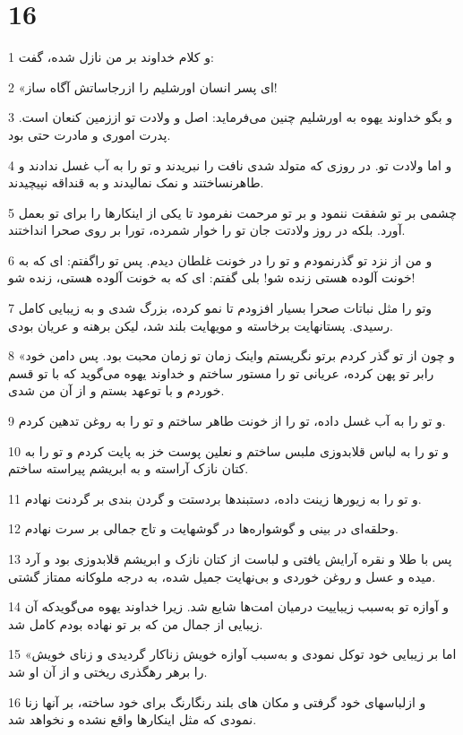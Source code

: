 \chapter{16}

\par 1 و کلام خداوند بر من نازل شده، گفت:
\par 2 «ای پسر انسان اورشلیم را ازرجاساتش آگاه ساز!
\par 3 و بگو خداوند یهوه به اورشلیم چنین می‌فرماید: اصل و ولادت تو اززمین کنعان است. پدرت اموری و مادرت حتی بود.
\par 4 و اما ولادت تو. در روزی که متولد شدی نافت را نبریدند و تو را به آب غسل ندادند و طاهرنساختند و نمک نمالیدند و به قنداقه نپیچیدند.
\par 5 چشمی بر تو شفقت ننمود و بر تو مرحمت نفرمود تا یکی از اینکارها را برای تو بعمل آورد. بلکه در روز ولادتت جان تو را خوار شمرده، تورا بر روی صحرا انداختند.
\par 6 و من از نزد تو گذرنمودم و تو را در خونت غلطان دیدم. پس تو راگفتم: ای که به خونت آلوده هستی زنده شو! بلی گفتم: ای که به خونت آلوده هستی، زنده شو!
\par 7 وتو را مثل نباتات صحرا بسیار افزودم تا نمو کرده، بزرگ شدی و به زیبایی کامل رسیدی. پستانهایت برخاسته و مویهایت بلند شد، لیکن برهنه و عریان بودی.
\par 8 «و چون از تو گذر کردم برتو نگریستم واینک زمان تو زمان محبت بود. پس دامن خود رابر تو پهن کرده، عریانی تو را مستور ساختم و خداوند یهوه می‌گوید که با تو قسم خوردم و با توعهد بستم و از آن من شدی.
\par 9 و تو را به آب غسل داده، تو را از خونت طاهر ساختم و تو را به روغن تدهین کردم.
\par 10 و تو را به لباس قلابدوزی ملبس ساختم و نعلین پوست خز به پایت کردم و تو را به کتان نازک آراسته و به ابریشم پیراسته ساختم.
\par 11 و تو را به زیورها زینت داده، دستبندها بردستت و گردن بندی بر گردنت نهادم.
\par 12 وحلقه‌ای در بینی و گوشواره‌ها در گوشهایت و تاج جمالی بر سرت نهادم.
\par 13 پس با طلا و نقره آرایش یافتی و لباست از کتان نازک و ابریشم قلابدوزی بود و آرد میده و عسل و روغن خوردی و بی‌نهایت جمیل شده، به درجه ملوکانه ممتاز گشتی.
\par 14 و آوازه تو به‌سبب زیباییت درمیان امت‌ها شایع شد. زیرا خداوند یهوه می‌گویدکه آن زیبایی از جمال من که بر تو نهاده بودم کامل شد.
\par 15 «اما بر زیبایی خود توکل نمودی و به‌سبب آوازه خویش زناکار گردیدی و زنای خویش را برهر رهگذری ریختی و از آن او شد.
\par 16 و ازلباسهای خود گرفتی و مکان های بلند رنگارنگ برای خود ساخته، بر آنها زنا نمودی که مثل اینکارها واقع نشده و نخواهد شد.
